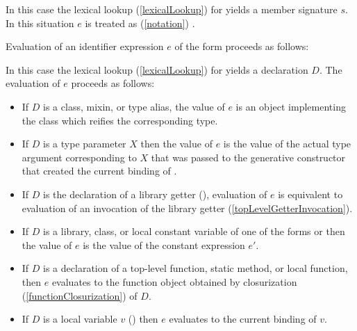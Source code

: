 \documentclass[makeidx]{article}
\begin{document}
{%
\EndCase

\LMHash{}%
In this case the lexical lookup
(\ref{lexicalLookup})
for \id{} yields a member signature $s$.
%
In this situation $e$ is treated as
(\ref{notation})
.

\EndCase

\LMHash{}%
Evaluation of an identifier expression $e$ of the form \id{}
proceeds as follows:

\LMHash{}%
In this case the lexical lookup
(\ref{lexicalLookup})
for \id{} yields a declaration $D$.
The evaluation of $e$ proceeds as follows:

\begin{itemize}
\item
  If $D$ is a class, mixin, or type alias,
  the value of $e$ is an object implementing the class 
  which reifies the corresponding type.
\item
  If $D$ is a type parameter $X$ then the value of $e$ is
  the value of the actual type argument corresponding to $X$
  that was passed to the generative constructor that created
  the current binding of \THIS{}.
\item
  If $D$ is the declaration of a library getter
  (),
  evaluation of $e$ is equivalent to evaluation of an invocation of
  the library getter \id{}
  (\ref{topLevelGetterInvocation}).
\item
  If $D$ is a library, class, or local constant variable of one of the forms
   or 
  then the value of $e$ is the value of the constant expression $e'$.
\item
  If $D$ is a declaration of
  a top-level function, static method, or local function,
  then $e$ evaluates to the function object obtained by closurization
  (\ref{functionClosurization})
  of $D$.
\item
  If $D$ is a local variable $v$
  ()
  then $e$ evaluates to the current binding of $v$.
\end{itemize}

}
\end{document}
